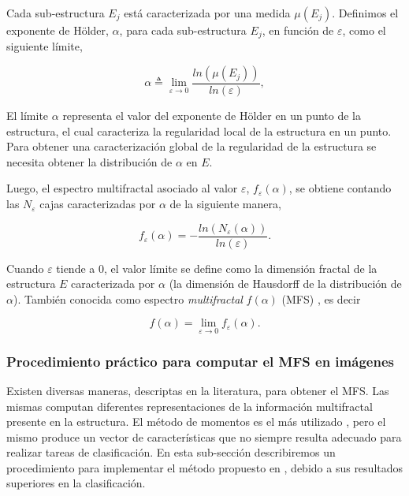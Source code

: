 Cada sub-estructura $E_{j}$ está caracterizada por una medida $\mu(E_{j})$.
Definimos el exponente de H\"older, $\alpha$, para cada sub-estructura $E_{j}$, en función de $\varepsilon$, como el siguiente límite,


\begin{equation}
\alpha \triangleq \lim_{\varepsilon \rightarrow 0}{\frac{ln(\mu(E_{j}))}{ln(\varepsilon)} },
\label{eq:holder}
\end{equation}
\noindent

El límite $\alpha$ representa el valor del exponente de H\"older en un punto de la estructura, el cual caracteriza la regularidad local de la estructura en un punto.
Para obtener una caracterización global de la regularidad de la estructura se necesita obtener la distribución de $\alpha$ en $E$.

Luego, el espectro multifractal asociado al valor $\varepsilon$, $f_{\varepsilon}(\alpha)$, se obtiene contando las $N_{\varepsilon}$ cajas caracterizadas por $\alpha$ de la siguiente manera,

\begin{equation}
f_{\varepsilon}(\alpha) = - \frac{ln(N_{\varepsilon}(\alpha))}{ln(\varepsilon)}.
\label{eq:eqn6}
\end{equation}

Cuando $\varepsilon$ tiende a $0$, el valor límite se define como la dimensión fractal de la estructura $E$ caracterizada por $\alpha$ (la dimensión de Hausdorff de la distribución de $\alpha$).
También conocida como espectro {\em multifractal} $f(\alpha)$ (MFS) \cite{Silvetti2010}, es decir

\begin{equation}
f(\alpha) = \lim_{\varepsilon\to0}{f_{\varepsilon}(\alpha)}.
\label{eq:mfs}
\end{equation}

\subsubsection{Procedimiento práctico para computar el MFS en imágenes}
Existen diversas maneras, descriptas en la literatura, para obtener el MFS.
Las mismas computan diferentes representaciones de la información multifractal presente en la estructura.
El método de momentos es el más utilizado \cite{Mendoza2010,Serrano2012}, pero el mismo produce un vector de características que no siempre resulta adecuado para realizar tareas de clasificación.
En esta sub-sección describiremos un procedimiento para implementar el método propuesto en \cite{Xu2009}, debido a sus resultados superiores en la clasificación.

